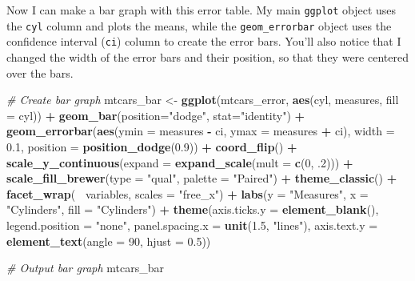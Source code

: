 \documentclass[
  openany]{book}
\newenvironment{Shaded}{\begin{snugshade}}{\end{snugshade}}
\newcommand{\CommentTok}[1]{\textcolor[rgb]{0.56,0.35,0.01}{\textit{#1}}}
\newcommand{\DataTypeTok}[1]{\textcolor[rgb]{0.13,0.29,0.53}{#1}}
\newcommand{\DecValTok}[1]{\textcolor[rgb]{0.00,0.00,0.81}{#1}}
\newcommand{\FloatTok}[1]{\textcolor[rgb]{0.00,0.00,0.81}{#1}}
\newcommand{\KeywordTok}[1]{\textcolor[rgb]{0.13,0.29,0.53}{\textbf{#1}}}
\newcommand{\NormalTok}[1]{#1}
\newcommand{\OperatorTok}[1]{\textcolor[rgb]{0.81,0.36,0.00}{\textbf{#1}}}
\newcommand{\StringTok}[1]{\textcolor[rgb]{0.31,0.60,0.02}{#1}}
\begin{document}
Now I can make a bar graph with this error table. My main \texttt{ggplot} object uses the \texttt{cyl} column and plots the means, while the \texttt{geom\_errorbar} object uses the confidence interval (\texttt{ci}) column to create the error bars. You'll also notice that I changed the width of the error bars and their position, so that they were centered over the bars.

\begin{Shaded}
\begin{Highlighting}[]
\CommentTok{# Create bar graph}
\NormalTok{mtcars_bar <-}\StringTok{ }\KeywordTok{ggplot}\NormalTok{(mtcars_error, }\KeywordTok{aes}\NormalTok{(cyl, measures, }\DataTypeTok{fill =}\NormalTok{ cyl)) }\OperatorTok{+}
\StringTok{  }\KeywordTok{geom_bar}\NormalTok{(}\DataTypeTok{position=}\StringTok{"dodge"}\NormalTok{, }\DataTypeTok{stat=}\StringTok{"identity"}\NormalTok{) }\OperatorTok{+}
\StringTok{  }\KeywordTok{geom_errorbar}\NormalTok{(}\KeywordTok{aes}\NormalTok{(}\DataTypeTok{ymin =}\NormalTok{ measures }\OperatorTok{-}\StringTok{ }\NormalTok{ci, }\DataTypeTok{ymax =}\NormalTok{ measures }\OperatorTok{+}\StringTok{ }\NormalTok{ci), }
                \DataTypeTok{width =} \FloatTok{0.1}\NormalTok{, }\DataTypeTok{position =} \KeywordTok{position_dodge}\NormalTok{(}\FloatTok{0.9}\NormalTok{)) }\OperatorTok{+}
\StringTok{  }\KeywordTok{coord_flip}\NormalTok{() }\OperatorTok{+}
\StringTok{  }\KeywordTok{scale_y_continuous}\NormalTok{(}\DataTypeTok{expand =} \KeywordTok{expand_scale}\NormalTok{(}\DataTypeTok{mult =} \KeywordTok{c}\NormalTok{(}\DecValTok{0}\NormalTok{, }\FloatTok{.2}\NormalTok{))) }\OperatorTok{+}
\StringTok{  }\KeywordTok{scale_fill_brewer}\NormalTok{(}\DataTypeTok{type =} \StringTok{"qual"}\NormalTok{, }\DataTypeTok{palette =} \StringTok{"Paired"}\NormalTok{) }\OperatorTok{+}
\StringTok{  }\KeywordTok{theme_classic}\NormalTok{() }\OperatorTok{+}
\StringTok{  }\KeywordTok{facet_wrap}\NormalTok{(}\OperatorTok{~}\StringTok{ }\NormalTok{variables, }\DataTypeTok{scales =} \StringTok{"free_x"}\NormalTok{) }\OperatorTok{+}
\StringTok{  }\KeywordTok{labs}\NormalTok{(}\DataTypeTok{y =} \StringTok{"Measures"}\NormalTok{,}
       \DataTypeTok{x =} \StringTok{"Cylinders"}\NormalTok{,}
       \DataTypeTok{fill =} \StringTok{"Cylinders"}\NormalTok{) }\OperatorTok{+}
\StringTok{  }\KeywordTok{theme}\NormalTok{(}\DataTypeTok{axis.ticks.y =} \KeywordTok{element_blank}\NormalTok{(),}
        \DataTypeTok{legend.position =} \StringTok{"none"}\NormalTok{,}
        \DataTypeTok{panel.spacing.x =} \KeywordTok{unit}\NormalTok{(}\FloatTok{1.5}\NormalTok{, }\StringTok{"lines"}\NormalTok{),}
        \DataTypeTok{axis.text.y =} \KeywordTok{element_text}\NormalTok{(}\DataTypeTok{angle =} \DecValTok{90}\NormalTok{, }\DataTypeTok{hjust =} \FloatTok{0.5}\NormalTok{))}

\CommentTok{# Output bar graph}
\NormalTok{mtcars_bar}
\end{Highlighting}
\end{Shaded}
\end{document}
